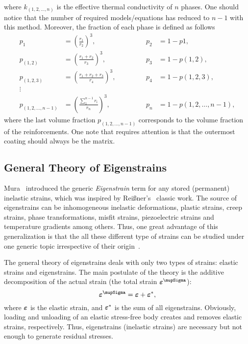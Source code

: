 	where $k_{(1,2,\ldots,n)}$ is the effective thermal conductivity of $n$ phases. One should notice that the number of required models/equations has reduced to $n-1$ with this method. Moreover, the fraction of each phase is defined as follows
	\begin{subequations}
	\begin{alignat}{3}
	p_{1} &= (\frac{r_1}{r_2})^3,&&&   p_{2}&=1-p{1},   \\
	p_{(1,2)} &= (\frac{r_1+r_2}{r_3})^3,&&&   p_{3}&=1-p{(1,2)},   \\
	p_{(1,2,3)} &= (\frac{r_1+r_2+r_3}{r_4})^3,&&&   p_{4}&=1-p{(1,2,3)},   \\\nonumber
	\vdots\\
	p_{(1,2,\ldots,n-1)} &= (\frac{\sum_{1}^{n-1}r_i}{r_n})^3,&&\qquad&   p_{n}&=1-p{(1,2,\ldots,n-1)},
	\end{alignat}
	\end{subequations}	
	where the last volume fraction $p_{(1,2,\ldots,n-1)}$ corresponds to the volume fraction of the reinforcements. One note that requires attention is that the outermost coating should always be the matrix.


\subsection{General Theory of Eigenstrains}
    Mura~\autocite*{Mura.1982} introduced the generic \textit{Eigenstrain} term for any stored (permanent) inelastic strains, which was inspired by Reißner's~\autocite*{Reissner.1931} classic work. The source of eigenstrains can be inhomogeneous inelastic deformations, plastic strains, creep strains, phase transformations, misfit strains, piezoelectric strains and temperature gradients among others. Thus, one great advantage of this generalization is that the all these different type of strains can be studied under one generic topic irrespective of their origin~\autocite{Jun.2010,Nyashin.2005}.

The general theory of eigenstrains deals with only two types of strains: elastic strains and eigenstrains. The main postulate of the theory is the additive decomposition of the actual strain (the total strain $\tenb{\varepsilon}^{\mupSigma}$): 
\begin{equation}
\tenb{\varepsilon}^{\mupSigma}=\tenb{\varepsilon}+\tenb{\varepsilon}^\eigen,\label{eq:eignestrains}
\end{equation}
where $\tenb{\varepsilon}$ is the elastic strain, and $\tenb{\varepsilon}^\eigen$ is the sum of all eigenstrains. Obviously, loading and unloading of an elastic stress-free body creates and removes elastic strains, respectively. Thus, eigenstrains (inelastic strains) are necessary but not enough to generate residual stresses. 

